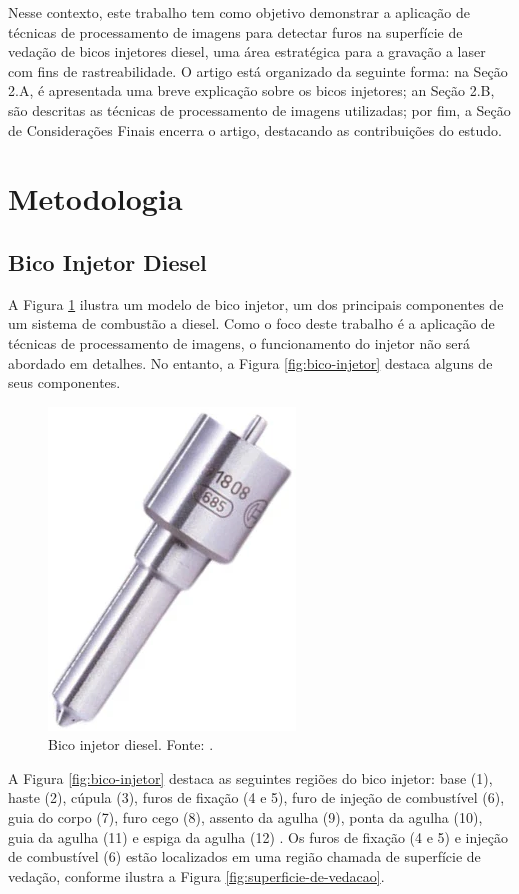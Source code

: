 \documentclass[conference]{IEEEtran}
\begin{document}
Nesse contexto, este trabalho tem como objetivo demonstrar a aplicação de técnicas de processamento de imagens para detectar furos na superfície de vedação de bicos injetores diesel, uma área estratégica para a gravação a laser com fins de rastreabilidade. O artigo está organizado da seguinte forma: na Seção 2.A, é apresentada uma breve explicação sobre os bicos injetores; an Seção 2.B, são descritas as técnicas de processamento de imagens utilizadas; por fim, a Seção de Considerações Finais encerra o artigo, destacando as contribuições do estudo.

\section{Metodologia}
\subsection{Bico Injetor Diesel}

A Figura \ref{fig:bico-injetor-real} ilustra um modelo de bico injetor, um dos principais componentes de um sistema de combustão a diesel. Como o foco deste trabalho é a aplicação de técnicas de processamento de imagens, o funcionamento do injetor não será abordado em detalhes. No entanto, a Figura \ref{fig:bico-injetor} destaca alguns de seus componentes.

\begin{figure}[b]
	\centering
	\includegraphics[scale=0.4]{Images/bico-injetor-real.png}
	\caption{Bico injetor diesel. Fonte: \cite{karhub}.}
	\label{fig:bico-injetor-real}
\end{figure}

A Figura \ref{fig:bico-injetor} destaca as seguintes regiões do bico injetor: base (1), haste (2), cúpula (3), furos de fixação (4 e 5), furo de injeção de combustível (6), guia do corpo (7), furo cego (8), assento da agulha (9), ponta da agulha (10), guia da agulha (11) e espiga da agulha (12) \cite{Girotto2023}. Os furos de fixação (4 e 5) e injeção de combustível (6) estão localizados em uma região chamada de superfície de vedação, conforme ilustra a Figura \ref{fig:superficie-de-vedacao}.
 
\end{document}
